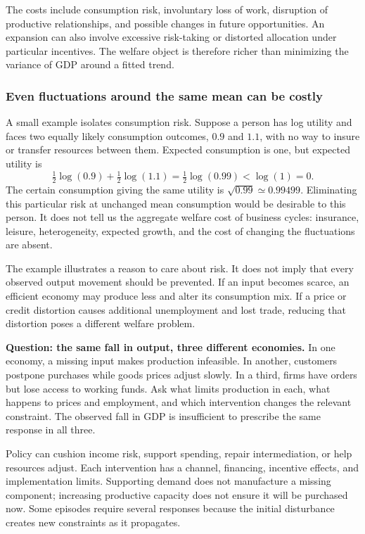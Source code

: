 The costs include consumption risk, involuntary loss of work, disruption
of productive relationships, and possible changes in future opportunities.
An expansion can also involve excessive risk-taking or distorted allocation
under particular incentives. The welfare object is therefore richer than
minimizing the variance of GDP around a fitted trend.

\subsubsection{Even fluctuations around the same mean can be costly}

A small example isolates consumption risk. Suppose a person has log utility
and faces two equally likely consumption outcomes, $0.9$ and $1.1$, with
no way to insure or transfer resources between them. Expected consumption
is one, but expected utility is
\[
\tfrac12\log(0.9)+\tfrac12\log(1.1)
=\tfrac12\log(0.99)<\log(1)=0.
\]
The certain consumption giving the same utility is
$\sqrt{0.99}\simeq0.99499$. Eliminating this particular risk at unchanged
mean consumption would be desirable to this person. It does not tell us the
aggregate welfare cost of business cycles: insurance, leisure, heterogeneity,
expected growth, and the cost of changing the fluctuations are absent.

The example illustrates a reason to care about risk. It does not imply
that every observed output movement should be prevented. If an input becomes
scarce, an efficient economy may produce less and alter its consumption mix.
If a price or credit distortion causes additional unemployment and lost
trade, reducing that distortion poses a different welfare problem.

\begin{redblock}
\textbf{Question: the same fall in output, three different economies.}
In one economy, a missing input makes production infeasible. In another,
customers postpone purchases while goods prices adjust slowly. In a third,
firms have orders but lose access to working funds. Ask what limits production
in each, what happens to prices and employment, and which intervention changes
the relevant constraint. The observed fall in GDP is insufficient to prescribe
the same response in all three.
\end{redblock}

Policy can cushion income risk, support spending, repair intermediation,
or help resources adjust. Each intervention has a channel, financing,
incentive effects, and implementation limits. Supporting demand does not
manufacture a missing component; increasing productive capacity does not
ensure it will be purchased now. Some episodes require several responses
because the initial disturbance creates new constraints as it propagates.

